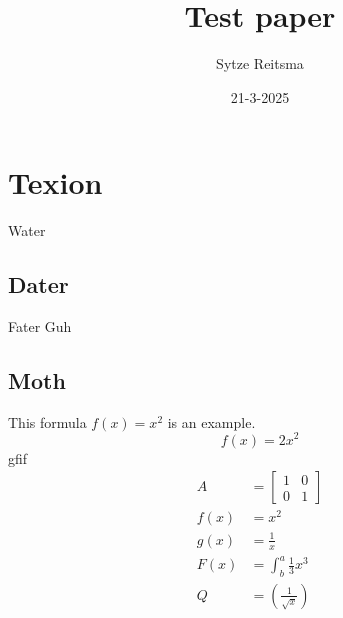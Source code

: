 \documentclass{article}
\title{Test paper}
\date{21-3-2025}
\author{Sytze Reitsma}
\begin{document}
    \maketitle
    \newpage
    \section{Texion}
    Water
    \subsection{Dater}
    Fater  
    Guh
    \subsection{Moth}
    This formula $f(x) = x^2$ is an example.
    \begin{equation*}
        f(x) = 2x^2
    \end{equation*}
    gfif
    \begin{align*}
        A&=\left[
        \begin{matrix}
        1 & 0\\
        0 & 1
        \end{matrix}
        \right]\\
        f(x) &= x^2\\
        g(x) &= \frac{1}{x}\\
        F(x) &= \int^a_b \frac{1}{3}x^3\\
        Q&=\left(\frac{1}{\sqrt{x}}\right)
      \end{align*}
      
    
    
\end{document}
